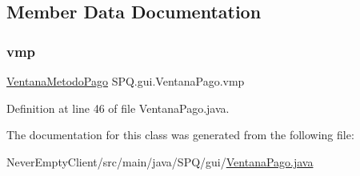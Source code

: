 \subsection{Member Data Documentation}
\mbox{\label{class_s_p_q_1_1gui_1_1_ventana_pago_a892d5d5fa9310e73e222681af8d5a53f}} 
\subsubsection{\texorpdfstring{vmp}{vmp}}
{\footnotesize\ttfamily \mbox{\hyperlink{class_s_p_q_1_1gui_1_1_ventana_metodo_pago}{Ventana\+Metodo\+Pago}} S\+P\+Q.\+gui.\+Ventana\+Pago.\+vmp\hspace{0.3cm}{\ttfamily [static]}}



Definition at line 46 of file Ventana\+Pago.\+java.



The documentation for this class was generated from the following file\+:\begin{DoxyCompactItemize}
\item 
Never\+Empty\+Client/src/main/java/\+S\+P\+Q/gui/\mbox{\hyperlink{_ventana_pago_8java}{Ventana\+Pago.\+java}}\end{DoxyCompactItemize}
